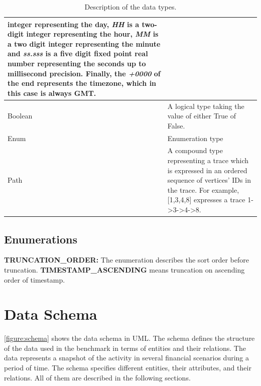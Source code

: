 \begin{table}[h]
\begin{tabular}{|>{\typeCell}p{\attributeColumnWidth}|p{\largeDescriptionColumnWidth}|}
        integer representing the day, \textit{HH} is a two-digit integer
        representing the hour, \textit{MM} is a two digit integer representing
        the minute and \textit{ss.sss} is a five digit fixed point real number
        representing the seconds up to millisecond precision. Finally, the
        \textit{+0000} of the end represents the timezone, which in this case is
        always GMT.                                                              \\
        \hline
        Boolean                 & A logical type taking the value of either True
        of False.                                                                \\
        \hline
        Enum                    & Enumeration type                               \\
        \hline
        Path                    & A compound type representing a trace which is
        expressed in an ordered sequence of vertices' IDs in the trace. For
        example, [1,3,4,8] expresses a trace 1->3->4->8.                         \\
        \hline
    \end{tabular}
    \caption{Description of the data types.}
    \label{table:types}
\end{table}

\subsection{Enumerations}
{\flushleft \textbf{TRUNCATION\_ORDER:}} The enumeration describes the sort
order before truncation. \textbf{TIMESTAMP\_ASCENDING} means truncation on
ascending order of timestamp.


\section{Data Schema}

\autoref{figure:schema} shows the data schema in UML. The schema defines the
structure of the data used in the benchmark in terms of entities and their
relations. The data represents a snapshot of the activity in several financial
scenarios during a period of time. The schema specifies different entities,
their attributes, and their relations. All of them are described in the
following sections.


